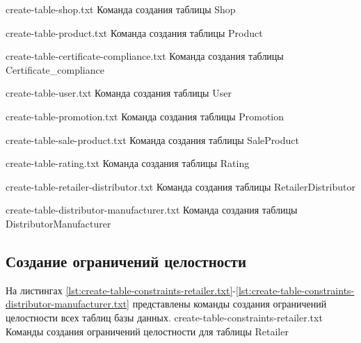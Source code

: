 {create-table-shop.txt} %
{Команда создания таблицы Shop} %

{create-table-product.txt} %
{Команда создания таблицы Product} %

\clearpage 

{create-table-certificate-compliance.txt} %
{Команда создания таблицы Certificate\_compliance} %

{create-table-user.txt} %
{Команда создания таблицы User} %

{create-table-promotion.txt} %
{Команда создания таблицы Promotion} %

\clearpage

{create-table-sale-product.txt} %
{Команда создания таблицы SaleProduct} %

{create-table-rating.txt} %
{Команда создания таблицы Rating} %

{create-table-retailer-distributor.txt} %
{Команда создания таблицы RetailerDistributor} %

{create-table-distributor-manufacturer.txt} %
{Команда создания таблицы DistributorManufacturer} %

\clearpage

\subsection{Создание ограничений целостности}

На листингах \ref{lst:create-table-constraints-retailer.txt}-\ref{lst:create-table-constraints-distributor-manufacturer.txt} представлены команды создания ограничений целостности всех таблиц базы данных.
{create-table-constraints-retailer.txt} %
{Команды создания ограничений целостности для таблицы Retailer} %

